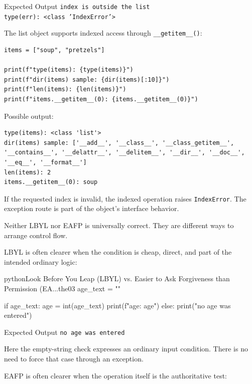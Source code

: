 \begin{iobox}{Expected Output}
\texttt{index is outside the list} \\
\texttt{type(err): <class 'IndexError'>} \\
\end{iobox}


The list object supports indexed access through \texttt{\_\_getitem\_\_()}:

\begin{verbatim}
items = ["soup", "pretzels"]

print(f"type(items): {type(items)}")
print(f"dir(items) sample: {dir(items)[:10]}")
print(f"len(items): {len(items)}")
print(f"items.__getitem__(0): {items.__getitem__(0)}")
\end{verbatim}

Possible output:

\begin{verbatim}
type(items): <class 'list'>
dir(items) sample: ['__add__', '__class__', '__class_getitem__',
'__contains__', '__delattr__', '__delitem__', '__dir__', '__doc__',
'__eq__', '__format__']
len(items): 2
items.__getitem__(0): soup
\end{verbatim}

If the requested index is invalid, the indexed operation raises \texttt{IndexError}. The exception route is part of the object's interface behavior.

Neither LBYL nor EAFP is universally correct. They are different ways to arrange control flow.

LBYL is often clearer when the condition is cheap, direct, and part of the intended ordinary logic:

\begin{codebox}[]{python}{Look Before You Leap (LBYL) vs. Easier to Ask Forgiveness than Permission (EA...}{the03}
age_text = ""

if age_text:
    age = int(age_text)
    print(f"age: {age}")
else:
    print("no age was entered")
\end{codebox}


\begin{iobox}{Expected Output}
\texttt{no age was entered} \\
\end{iobox}


Here the empty-string check expresses an ordinary input condition. There is no need to force that case through an exception.

EAFP is often clearer when the operation itself is the authoritative test:

